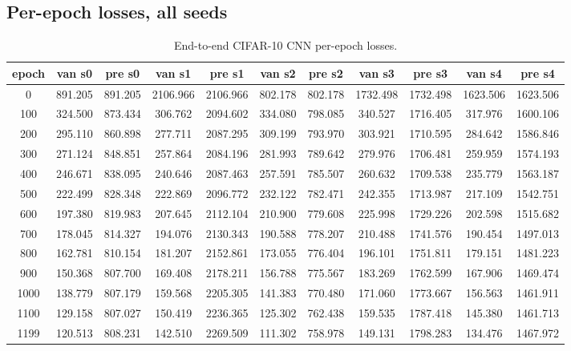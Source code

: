 \subsection*{Per-epoch losses, all seeds}
\begin{table}[H]
\centering
\caption{End-to-end CIFAR-10 CNN per-epoch losses.}
\label{tab:e2e-losses}
\begin{tabular}{c | c c c c c c c c c c }
\toprule
epoch & van s0 & pre s0 & van s1 & pre s1 & van s2 & pre s2 & van s3 & pre s3 & van s4 & pre s4 \\
\midrule
0 & 891.205 & 891.205 & 2106.966 & 2106.966 & 802.178 & 802.178 & 1732.498 & 1732.498 & 1623.506 & 1623.506 \\
100 & 324.500 & 873.434 & 306.762 & 2094.602 & 334.080 & 798.085 & 340.527 & 1716.405 & 317.976 & 1600.106 \\
200 & 295.110 & 860.898 & 277.711 & 2087.295 & 309.199 & 793.970 & 303.921 & 1710.595 & 284.642 & 1586.846 \\
300 & 271.124 & 848.851 & 257.864 & 2084.196 & 281.993 & 789.642 & 279.976 & 1706.481 & 259.959 & 1574.193 \\
400 & 246.671 & 838.095 & 240.646 & 2087.463 & 257.591 & 785.507 & 260.632 & 1709.538 & 235.779 & 1563.187 \\
500 & 222.499 & 828.348 & 222.869 & 2096.772 & 232.122 & 782.471 & 242.355 & 1713.987 & 217.109 & 1542.751 \\
600 & 197.380 & 819.983 & 207.645 & 2112.104 & 210.900 & 779.608 & 225.998 & 1729.226 & 202.598 & 1515.682 \\
700 & 178.045 & 814.327 & 194.076 & 2130.343 & 190.588 & 778.207 & 210.488 & 1741.576 & 190.454 & 1497.013 \\
800 & 162.781 & 810.154 & 181.207 & 2152.861 & 173.055 & 776.404 & 196.101 & 1751.811 & 179.151 & 1481.223 \\
900 & 150.368 & 807.700 & 169.408 & 2178.211 & 156.788 & 775.567 & 183.269 & 1762.599 & 167.906 & 1469.474 \\
1000 & 138.779 & 807.179 & 159.568 & 2205.305 & 141.383 & 770.480 & 171.060 & 1773.667 & 156.563 & 1461.911 \\
1100 & 129.158 & 807.027 & 150.419 & 2236.365 & 125.302 & 762.438 & 159.535 & 1787.418 & 145.380 & 1461.713 \\
1199 & 120.513 & 808.231 & 142.510 & 2269.509 & 111.302 & 758.978 & 149.131 & 1798.283 & 134.476 & 1467.972 \\
\bottomrule
\end{tabular}
\end{table}

